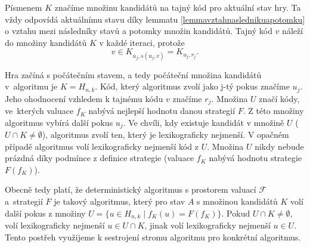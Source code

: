 








Písmenem $K$ značíme množinu kandidátů na tajný kód pro aktuální stav hry. Ta vždy odpovídá aktuálnímu stavu díky lemmatu \ref{lemmavztahnaslednikuapotomku} o vztahu mezi následníky stavů a potomky množin kandidátů. Tajný kód $v$ náleží do množiny kandidátů $K$ v každé iteraci, protože 
\[v \in K_{u_j, s(u_j,v)} = K_{u_j, r_j}.\]

Hra začíná s počátečním stavem, a tedy počáteční množina kandidátů v~algoritmu je $K = H_{n,k}$. Kód, který algoritmus zvolí jako j-tý pokus značíme $u_j$. Jeho ohodnocení vzhledem k tajnému kódu $v$ značíme $r_j$. Množina $U$ značí kódy, ve~kterých valuace $f_K$ nabývá nejlepší hodnotu danou strategií $F$. Z této množiny algoritmus vybírá další pokus $u_j$. Ve chvíli, kdy existuje kandidát v množině $U$ ($U\cap K \neq \emptyset$), algoritmus zvolí ten, který je lexikograficky nejmenší. V opačném případě algoritmus volí lexikograficky nejmenší kód z $U$. Množina $U$ nikdy nebude prázdná díky podmínce z definice strategie (valuace $f_K$ nabývá hodnotu strategie $F(f_K)$). 

Obecně tedy platí, že deterministický algoritmus s prostorem valuací $\mathcal{F}$ a~strategií $F$ je takový algoritmus, který pro stav $A$ s množinou kandidátů $K$ volí další pokus z množiny $U = \{u \in H_{n,k} \mid f_K(u) = F(f_K)\}$. Pokud $U \cap K \neq \emptyset$, volí lexikograficky nejmenší $u \in U \cap K$, jinak volí lexikograficky nejmenší $u \in U$. Tento postřeh využijeme k sestrojení stromu algoritmu pro konkrétní algoritmus.



